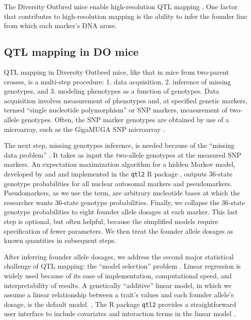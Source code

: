 \documentclass[oneside]{book}\usepackage[]{graphicx}\usepackage[]{color}
\begin{document}
The Diversity Outbred mice enable high-resolution QTL mapping \citep{gatti2014quantitative}. One factor that contributes to high-resolution mapping is the ability to infer the founder line from which each marker's DNA arose. 




\subsection{QTL mapping in DO mice}

QTL mapping in Diversity Outbred mice, like that in mice from two-parent crosses, is a multi-step procedure: 1. data acquisition, 2. inference of missing genotypes, and 3. modeling phenotypes as a function of genotypes. Data acquisition involves measurement of phenotypes and, at specified genetic markers, termed ``single nucleotide polymorphism'' or SNP markers, measurement of two-allele genotypes. Often, the SNP marker genotypes are obtained by use of a microarray, such as the GigaMUGA SNP microarray \citep{morgan2015mouse}. 

The next step, missing genotypes inference, is needed because of the ``missing data problem'' \citep{broman2009guide}. It takes as input the two-allele genotypes at the measured SNP markers. An expectation maximization algorithm \citep{dempster1977maximum} for a hidden Markov model, developed by \citet{broman2012haplotype} and \citet{broman2012genotype} and implemented in the \texttt{qtl2} R package \citep{broman2019rqtl2}, outputs 36-state genotype probabilities for all nuclear autosomal markers and pseudomarkers. Pseudomarkers, as we use the term, are arbitrary nucleotide bases at which the researcher wants 36-state genotype probabilities. Finally, we collapse the 36-state genotype probabilities to eight founder allele dosages at each marker. This last step is optional, but often helpful, because the simplified models require specification of fewer parameters. We then treat the founder allele dosages as known quantities in subsequent steps. 


After inferring founder allele dosages, we address the second major statistical challenge of 
QTL mapping: the ``model selection'' problem \citep{broman2009guide}.
Linear regression is widely used because of its ease of implementation,
computational speed, and interpretability of results.
A genetically ``additive'' linear model, in which we assume a linear relationship between
a trait's values and each founder allele's dosage, is the default model.
\citep{gatti2014quantitative,broman2019rqtl2}.
The R package \texttt{qtl2} provides a straightforward user
interface to include covariates and interaction terms in the linear model \citep{broman2019rqtl2}.
\end{document}
